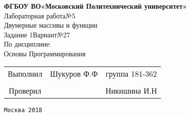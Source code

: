 \documentclass[a4paper]{article}
\begin{document}
\begin{center}
\hfill \break
\large{\textbf{ФГБОУ ВО«Московский Политехнический университет»}}\\
\hfill \break
\hfill \break
\hfill \break
\hfill \break
\hfill \break
\hfill \break
\hfill \break
\large{Лабораторная работа№5}\\
\footnotesize{Двумерные массивы и функции\\
Задание 1\hspace{3cm}Вариант№27\break\\
По дисциплине:\\
Основы Программирования
}
\end{center}
\hfill \break
\hfill \break
\hfill \break
\hfill \break
\hfill \break
\hfill \break
\hfill \break
\hfill \break
\hfill \break
\hfill \break
\normalsize{ 
\begin{tabular}{ccc}
\hspace{4cm}Выполнил & Шукуров Ф.Ф  & группа 181-362\\
\\
\hspace{4cm}Проверил & \underline{\hspace{3cm}}& Никишина И.Н
\end{tabular}
}
\hfill \break
\hfill \break
\hfill \break
\hfill \break
\hfill \break
\hfill \break
\hfill \break
\hfill \break
\hfill \break
\hfill \break
\hfill \break
\hfill \break
\begin{center}\texttt{Москва 2018}\end{center}
\thispagestyle{empty}
\end{document}
